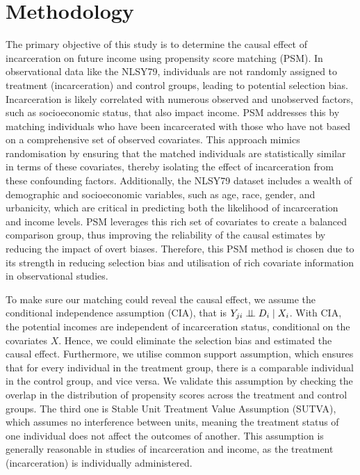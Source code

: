 \documentclass{article}[12pt]
\begin{document}
\section{Methodology} %
The primary objective of this study is to determine the causal effect of incarceration on future income using propensity score matching (PSM). In observational data like the NLSY79, individuals are not randomly assigned to treatment (incarceration) and control groups, leading to potential selection bias. Incarceration is likely correlated with numerous observed and unobserved factors, such as socioeconomic status, that also impact income. PSM addresses this by matching individuals who have been incarcerated with those who have not based on a comprehensive set of observed covariates. This approach mimics randomisation by ensuring that the matched individuals are statistically similar in terms of these covariates, thereby isolating the effect of incarceration from these confounding factors. Additionally, the NLSY79 dataset includes a wealth of demographic and socioeconomic variables, such as age, race, gender, and urbanicity, which are critical in predicting both the likelihood of incarceration and income levels. PSM leverages this rich set of covariates to create a balanced comparison group, thus improving the reliability of the causal estimates by reducing the impact of overt biases. Therefore, this PSM method is chosen due to its strength in reducing selection bias and utilisation of rich covariate information in observational studies. 
\par
To make sure our matching could reveal the causal effect, we assume the conditional independence assumption (CIA), that is $Y_{ji}\perp\kern-5pt\perp D_i \mid X_i$. With CIA, the potential incomes are independent of incarceration status, conditional on the covariates $X$. Hence, we could eliminate the selection bias and estimated the causal effect. Furthermore, we utilise common support assumption, which ensures that for every individual in the treatment group, there is a comparable individual in the control group, and vice versa. We validate this assumption by checking the overlap in the distribution of propensity scores across the treatment and control groups. The third one is Stable Unit Treatment Value Assumption (SUTVA), which assumes no interference between units, meaning the treatment status of one individual does not affect the outcomes of another. This assumption is generally reasonable in studies of incarceration and income, as the treatment (incarceration) is individually administered. 
\par
\end{document}
